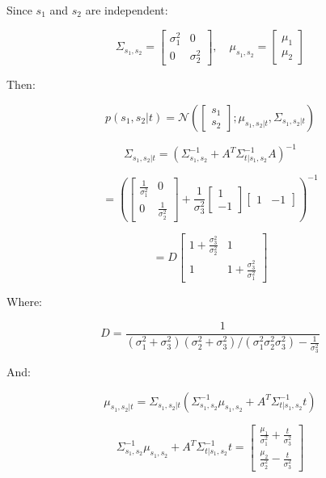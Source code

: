 Since $s_1$ and $s_2$ are independent:

\[
\Sigma_{s_1, s_2} = \begin{bmatrix} \sigma_1^2 & 0 \\ 0 & \sigma_2^2 \end{bmatrix}, \quad \mu_{s_1, s_2} = \begin{bmatrix} \mu_1 \\ \mu_2 \end{bmatrix}
\]

Then:

\[
p(s_1, s_2|t) = \mathcal{N}\left( \begin{bmatrix} s_1 \\ s_2 \end{bmatrix}; \mu_{s_1, s_2|t}, \Sigma_{s_1, s_2|t} \right)
\]

\[
\Sigma_{s_1, s_2|t} = \left( \Sigma_{s_1, s_2}^{-1} + A^T \Sigma_{t|s_1, s_2}^{-1} A \right)^{-1}
\]

\[
= \left( \begin{bmatrix} \frac{1}{\sigma_1^2} & 0 \\ 0 & \frac{1}{\sigma_2^2} \end{bmatrix} + \frac{1}{\sigma_3^2} \begin{bmatrix} 1 \\ -1 \end{bmatrix} \begin{bmatrix} 1 & -1 \end{bmatrix} \right)^{-1}
\]

\[
= D \begin{bmatrix} 1 + \frac{\sigma_3^2}{\sigma_2^2} & 1 \\ 1 & 1 + \frac{\sigma_3^2}{\sigma_1^2} \end{bmatrix}
\]

Where:

\[
D = \frac{1}{\left( \sigma_1^2 + \sigma_3^2 \right) \left( \sigma_2^2 + \sigma_3^2 \right) / \left( \sigma_1^2 \sigma_2^2 \sigma_3^2 \right) - \frac{1}{\sigma_3^2}}
\]

And:

\[
\mu_{s_1, s_2|t} = \Sigma_{s_1, s_2|t} \left( \Sigma_{s_1, s_2}^{-1} \mu_{s_1, s_2} + A^T \Sigma_{t|s_1, s_2}^{-1} t \right)
\]

\[
\Sigma_{s_1, s_2}^{-1} \mu_{s_1, s_2} + A^T \Sigma_{t|s_1, s_2}^{-1} t = \begin{bmatrix} \frac{\mu_1}{\sigma_1^2} + \frac{t}{\sigma_3^2} \\ \frac{\mu_2}{\sigma_2^2} - \frac{t}{\sigma_3^2} \end{bmatrix}
\]


